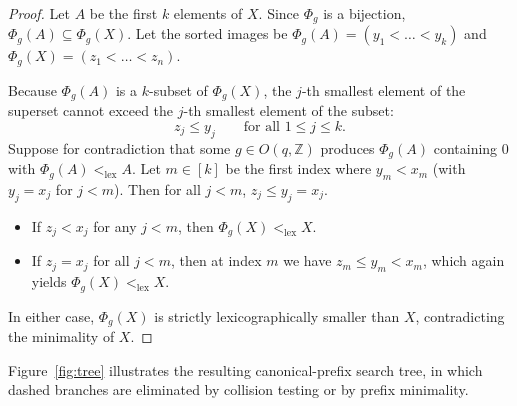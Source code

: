 \documentclass[11pt]{article}
\theoremstyle{plain}
\theoremstyle{definition}
\begin{document}
\begin{proof}
Let $A$ be the first $k$ elements of $X$. Since $\Phi_g$ is a bijection, $\Phi_g(A) \subseteq \Phi_g(X)$. Let the sorted images be $\Phi_g(A) = (y_1 < \dots < y_k)$ and $\Phi_g(X) = (z_1 < \dots < z_n)$.

Because $\Phi_g(A)$ is a $k$-subset of $\Phi_g(X)$, the $j$-th smallest element of the superset cannot exceed the $j$-th smallest element of the subset:
\[
  z_j \le y_j \qquad \text{for all } 1 \le j \le k.
\]
Suppose for contradiction that some $g \in O(q, \mathbb{Z})$ produces $\Phi_g(A)$ containing $0$ with $\Phi_g(A) <_{\mathrm{lex}} A$. Let $m \in [k]$ be the first index where $y_m < x_m$ (with $y_j = x_j$ for $j < m$). Then for all $j < m$, $z_j \le y_j = x_j$.
\begin{itemize}
\item If $z_j < x_j$ for any $j < m$, then $\Phi_g(X) <_{\mathrm{lex}} X$.
\item If $z_j = x_j$ for all $j < m$, then at index $m$ we have $z_m \le y_m < x_m$, which again yields $\Phi_g(X) <_{\mathrm{lex}} X$.
\end{itemize}
In either case, $\Phi_g(X)$ is strictly lexicographically smaller than $X$, contradicting the minimality of $X$.
\end{proof}

Figure~\ref{fig:tree} illustrates the resulting canonical-prefix search tree, in which dashed branches are eliminated by collision testing or by prefix minimality.
\end{document}
